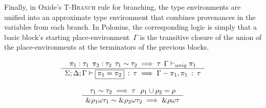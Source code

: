 \documentclass[11pt,a4paper,twoside,openany]{report}
\newcommand{\expression}[1]{\boxed{#1}}
\newcommand{\ntyperule}[2]{\begin{array}{c}#1\\\hline\raisebox{1pt}{\strut}#2\end{array}}
\begin{document}
Finally, in Oxide's \textsc{T-Branch} rule for branching, the type environments
are unified into an approximate type environment that combines provenances in
the variables from each branch. In Polonius, the corresponding logic is simply
that a basic block's starting place-environment~$\Gamma$ is the transitive
closure of the union of the place-environments at the terminators of the
previous blocks.

\begin{equation}\label{eq:t-assignment}
  \ntyperule{\pi_1 : \tau_1 \:\: \pi_2 : \tau_2 \:\: \tau_1 \sim \tau_2 \implies \tau \:\: \Gamma \vdash_{uniq} \pi_1}
  {\Sigma ; \Delta ; \Gamma \vdash \expression{\pi_1 = \pi_2} \: : \: \tau \implies \Gamma - \pi_1, \pi_1 \: : \: \tau}
\end{equation}

\begin{equation}\label{eq:u-ref}
  \ntyperule{\tau_1 \sim \tau_2 \implies \tau \:\:\: \rho_1 \cup \rho_2 = \rho}
  {\&\rho_1 \omega \tau_1 \sim \& \rho_2  \omega \tau_2 \implies \&\rho \omega \tau}
\end{equation}
\end{document}
